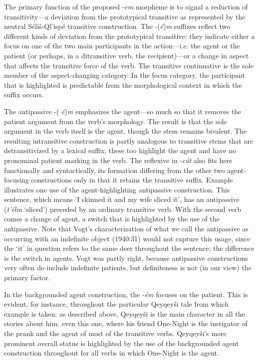 \documentclass[output=paper,colorlinks,citecolor=brown]{langscibook}
\begin{document}
The primary function of the proposed -\emph{em} morpheme is to signal
a reduction of transitivity---a deviation from the prototypical
transitive as represented by the neutral S\'eli\v{s}-Ql'isp\'e
transitive construction.  The -({\em \'e}){\em m} suffixes reflect two
different kinds of deviation from the prototypical transitive: they
indicate either a focus on one of the two main participants in the
action---i.e. the agent or the patient (or perhaps, in a
ditransitive verb, the recipient)---or a change in aspect that
affects the transitive force of the verb.  The transitive continuative
is the sole member of the aspect-changing category.  In the focus
category, the participant that is highlighted is predictable from the
morphological context in which the suffix occurs.


The antipassive -(\emph{ \'e})\emph{m} emphasizes the agent---so much
so that it removes the patient argument from the verb's morphology.
The result is that the sole argument in the verb itself is the agent,
though the stem remains bivalent.  The resulting intransitive
construction is partly analogous to transitive stems that are
detransitivized by a lexical suffix; these too highlight the agent and
have no pronominal patient marking in the verb.  The reflexive in
-\emph{c\'ut} also fits here functionally and syntactically, its
formation differing from the other two agent-focusing constructions
only in that it retains the transitive suffix.  Example  illustrates
one use of the agent-highlighting antipassive construction.  This
sentence, which means `I skinned it and my wife sliced it', has an
antipassive (\emph{t'\'elm} `sliced') preceded by an ordinary
transitive verb.  With the second verb comes a change of agent, a
switch that is highlighted by the use of the antipassive.  Note that
Vogt's characterization of what we call the antipassive as occurring
with an indefinite object (1940:31)
 would not capture this usage,
since the `it' in question refers to the same deer throughout the
sentence; the difference is the switch in agents.  Vogt was partly
right, because antipassive constructions very often do include
indefinite patients, but definiteness is not (in our view) the primary
factor.


In the backgrounded agent construction, the -\emph{\'em} focuses on the
patient.  This is evident, for instance, throughout the particular
Qeyqey\v{s}i tale from which example  is taken: as described above,
Qeyqey\v{s}i is the main character in all the stories about him, even
this one, where his friend One-Night is the instigator of the prank
and the agent of most of the transitive verbs.  Qeyqey\v{s}i's more
prominent overall status is highlighted by the use of the backgrounded
agent construction throughout for all verbs in which One-Night is the
agent.
\end{document}
